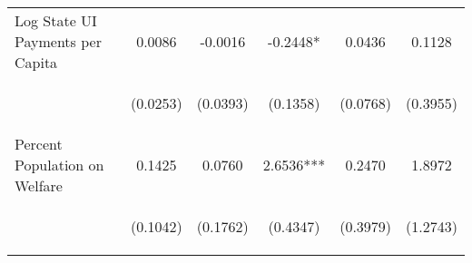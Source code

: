 \begin{center}
\begin{tabular}{lccccc}
\noalign{\smallskip}Log State UI Payments per Capita & \begin{scriptsize}0.0086\end{scriptsize} & \begin{scriptsize}-0.0016\end{scriptsize} & \begin{scriptsize}-0.2448*\end{scriptsize} & \begin{scriptsize}0.0436\end{scriptsize} & \begin{scriptsize}0.1128\end{scriptsize}\\
 & \begin{scriptsize}(0.0253)\end{scriptsize} & \begin{scriptsize}(0.0393)\end{scriptsize} & \begin{scriptsize}(0.1358)\end{scriptsize} & \begin{scriptsize}(0.0768)\end{scriptsize} & \begin{scriptsize}(0.3955)\end{scriptsize}\\
\noalign{\smallskip}Percent Population on Welfare & \begin{scriptsize}0.1425\end{scriptsize} & \begin{scriptsize}0.0760\end{scriptsize} & \begin{scriptsize}2.6536***\end{scriptsize} & \begin{scriptsize}0.2470\end{scriptsize} & \begin{scriptsize}1.8972\end{scriptsize}\\
 & \begin{scriptsize}(0.1042)\end{scriptsize} & \begin{scriptsize}(0.1762)\end{scriptsize} & \begin{scriptsize}(0.4347)\end{scriptsize} & \begin{scriptsize}(0.3979)\end{scriptsize} & \begin{scriptsize}(1.2743)\end{scriptsize}\\

\end{tabular}
\end{center}
